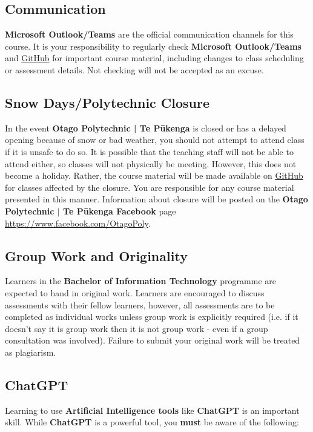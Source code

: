 \documentclass{article}
\begin{document}
\subsection*{Communication}
\textbf{Microsoft Outlook/Teams} are the official communication channels for this course. It is your responsibility to regularly check \textbf{Microsoft Outlook/Teams} and \href{https://github.com/otago-polytechnic-bit-courses/ID608001-intermediate-app-dev-concepts}{GitHub} for important course material, including changes to class scheduling or assessment details. Not checking will not be accepted as an excuse.

\subsection*{Snow Days/Polytechnic Closure}
In the event \textbf{Otago Polytechnic | Te Pūkenga} is closed or has a delayed opening because of snow or bad weather, you should not attempt to attend class if it is unsafe to do so. It is possible that the teaching staff will not be able to attend either, so classes will not physically be meeting. However, this does not become a holiday. Rather, the course material will be made available on \href{https://github.com/otago-polytechnic-bit-courses/ID608001-intermediate-app-dev-concepts}{GitHub} for classes affected by the closure. You are responsible for any course material presented in this manner. Information about closure will be posted on the \textbf{Otago Polytechnic $|$ Te Pūkenga Facebook} page \href{https://www.facebook.com/OtagoPoly}{https://www.facebook.com/OtagoPoly}.

\subsection*{Group Work and Originality}
Learners in the \textbf{Bachelor of Information Technology} programme are expected to hand in original work. Learners are encouraged to discuss assessments with their fellow learners, however, all assessments are to be completed as individual works unless group work is explicitly required (i.e. if it doesn't say it is group work then it is not group work - even if a group consultation was involved). Failure to submit your original work will be treated as plagiarism.

\subsection*{ChatGPT}
Learning to use \textbf{Artificial Intelligence tools} like \textbf{ChatGPT} is an important skill. While \textbf{ChatGPT} is a powerful tool, you \textbf{must} be aware of the following:
\end{document}
